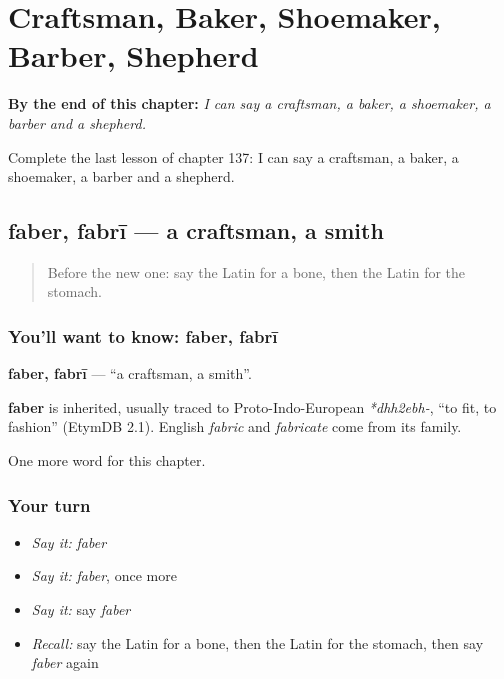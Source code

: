 
\chapter{Craftsman, Baker, Shoemaker, Barber, Shepherd}
\label{ch:la-craftsman-baker-shoemaker-barber-shepherd}

\begin{chapteropening}
\textbf{By the end of this chapter:} \emph{I can say a craftsman, a baker, a shoemaker, a barber and a shepherd.}

Complete the last lesson of chapter 137: I can say a craftsman, a baker, a shoemaker, a barber and a shepherd.
\end{chapteropening}

\section[faber, fabrī]{faber, fabrī — a craftsman, a smith}

\label{lesson:LA-C137-faber}



\begin{quote}
Before the new one: say the Latin for a bone, then the Latin for the stomach.
\end{quote}

\subsection*{You'll want to know: faber, fabrī}
\textbf{faber, fabrī} — \textquotedblleft{}a craftsman, a smith\textquotedblright{}.

\begin{cousinweb}
\textbf{faber} is inherited, usually traced to Proto-Indo-European \emph{*dhh2ebh-}, \textquotedblleft{}to fit, to fashion\textquotedblright{} (EtymDB 2.1). English \emph{fabric} and \emph{fabricate} come from its family.
\end{cousinweb}

\begin{grammarlens}[title={What you've built}]
One more word for this chapter.
\end{grammarlens}

\subsection*{Your turn}
\begin{itemize}
\raggedright
  \item \emph{Say it:} \emph{faber}
  \item \emph{Say it:} \emph{faber}, once more
  \item \emph{Say it:} say \emph{faber}
  \item \emph{Recall:} say the Latin for a bone, then the Latin for the stomach, then say \emph{faber} again
\end{itemize}

